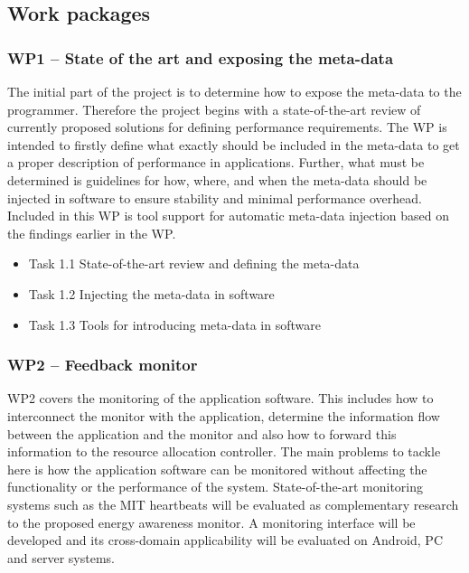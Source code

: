 \documentclass{article}
\begin{document}
\subsection{Work packages}
\subsubsection{WP1 -- State of the art and exposing the meta-data}
The initial part of the project is to determine how to expose the meta-data to the programmer.
Therefore the project begins with a state-of-the-art review of currently proposed solutions for defining performance requirements.
The WP is intended to firstly define what exactly should be included in the meta-data to get a proper description of performance in applications. 
Further, what must be determined is guidelines for how, where, and when the meta-data should be injected in software to ensure stability and minimal performance overhead.
Included in this WP is tool support for automatic meta-data injection based on the findings earlier in the WP.
\begin{itemize}
 \item Task 1.1 State-of-the-art review and defining the meta-data \vspace{-0.3cm}
 \item Task 1.2 Injecting the meta-data in software \vspace{-0.3cm}
 \item Task 1.3 Tools for introducing meta-data in software \vspace{-0.3cm}
\end{itemize}

\subsubsection{WP2 -- Feedback monitor}
WP2 covers the monitoring of the application software.
This includes how to interconnect the monitor with the application, determine the information flow between the application and the monitor and also how to forward this information to the resource allocation controller.
The main problems to tackle here is how the application software can be monitored without affecting the functionality or the performance of the system.
State-of-the-art monitoring systems such as the MIT heartbeats \cite{Hoffmann:10} will be evaluated as complementary research to the proposed energy awareness monitor.
A monitoring interface will be developed and its cross-domain applicability will be evaluated on Android, PC and server systems.
\end{document}
